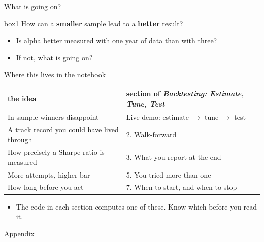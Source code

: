 \documentclass[aspectratio=169,10pt]{beamer}
\begin{document}
\begin{frame}{What is going on?}
	\begin{beamercolorbox}[rounded=true,sep=10pt,center]{box1}
		How can a \textbf{smaller} sample lead to a \textbf{better} result?
	\end{beamercolorbox}
	\vskip 20pt
	\begin{itemize}
		\item Is alpha better measured with one year of data than with three?
		\vskip 14pt
		\item If not, what is going on?
	\end{itemize}
\end{frame}
\begin{frame}{Where this lives in the notebook}
\begin{center}
\renewcommand{\arraystretch}{1.6}
\begin{tabular}{ll}
\toprule
the idea & section of \emph{Backtesting: Estimate, Tune, Test} \\
\midrule
In-sample winners disappoint & Live demo: estimate $\rightarrow$ tune $\rightarrow$ test \\
A track record you could have lived through & 2. Walk-forward \\
How precisely a Sharpe ratio is measured & 3. What you report at the end \\
More attempts, higher bar & 5. You tried more than one \\
How long before you act & 7. When to start, and when to stop \\
\bottomrule
\end{tabular}
\end{center}
\vskip 10pt
\begin{itemize}
\item The code in each section computes one of these. Know which before you read it.
\end{itemize}
\end{frame}

\appendix
\begin{frame}
\begin{center}
{\Large Appendix}
\end{center}
\end{frame}
\end{document}
